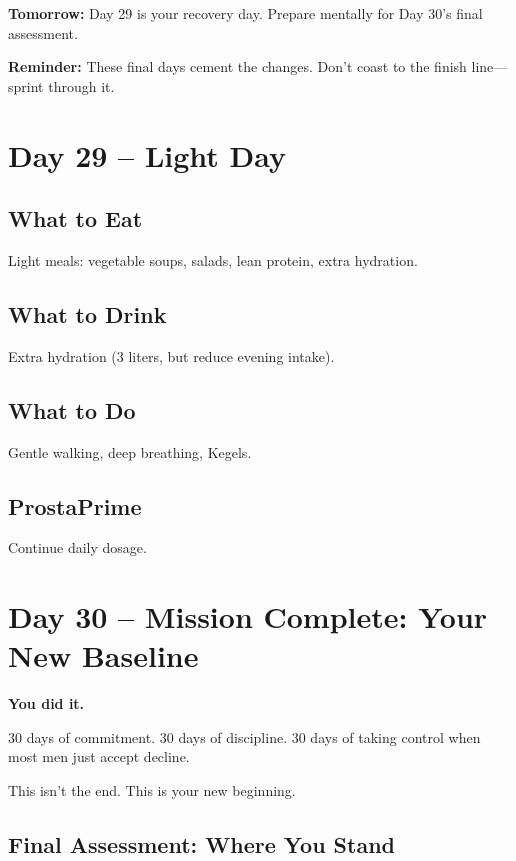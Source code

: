 \documentclass[11pt,oneside]{book}
\begin{document}
\textbf{Tomorrow:} Day 29 is your recovery day. Prepare mentally for Day 30's final assessment.

\textbf{Reminder:} These final days cement the changes. Don't coast to the finish line—sprint through it.

\clearpage


\chapter*{Day 29 – Light Day}

\section*{What to Eat}
Light meals: vegetable soups, salads, lean protein, extra hydration.

\section*{What to Drink}
Extra hydration (3 liters, but reduce evening intake).

\section*{What to Do}
Gentle walking, deep breathing, Kegels.

\section*{ProstaPrime}
Continue daily dosage.

\clearpage


\chapter*{Day 30 – Mission Complete: Your New Baseline}

\textbf{You did it.}

30 days of commitment. 30 days of discipline. 30 days of taking control when most men just accept decline.

This isn't the end. This is your new beginning.

\section*{Final Assessment: Where You Stand}
\end{document}
